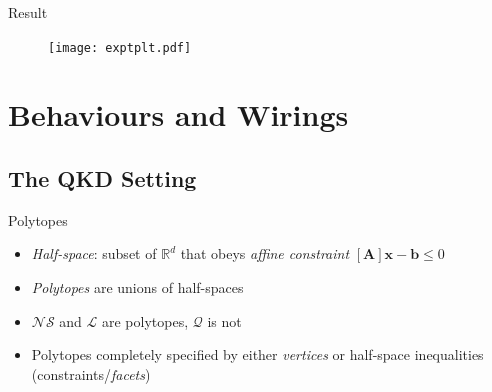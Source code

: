 \documentclass[xcolor=dvipsnames]{beamer}
\newcommand{\?}{\mathrel{?}} %
\newcommand{\cvec}[1]{\boldsymbol{\mathbf{#1}}}    %
\newcommand{\R}{\mathbb{R}} %
\newcommand{\matr}[1]{\left[\mathbf{#1}\right]} %
\newcommand{\Ls}{\mathcal{L}}
\newcommand{\Qs}{\mathcal{Q}}
\newcommand{\NSs}{\mathcal{NS}}
\begin{document}
\begin{frame}{Result}
    \begin{figure}
      \texttt{[image: exptplt.pdf]}
    \end{figure}
\end{frame}

\section{Behaviours and Wirings}

\subsection{The QKD Setting}

\begin{frame}{Polytopes}
  \begin{itemize}[<+->]
    \item \emph{Half-space}: subset of \(\R^d\) that obeys \emph{affine constraint} \(\matr{A}\cvec{x} - \cvec{b} \leq 0\)
    \item \emph{Polytopes} are unions of half-spaces
    \item \(\NSs\) and \(\Ls\) are polytopes, \alert{\(\Qs\) is not}
    \item Polytopes completely specified by either \emph{vertices} or half-space inequalities (constraints/\emph{facets})
  \end{itemize}
\end{frame}
\end{document}
